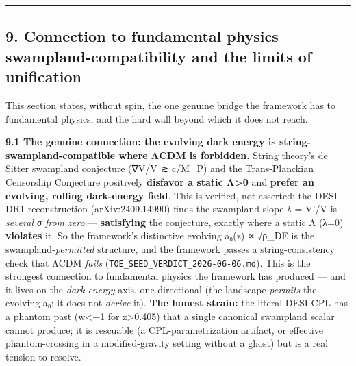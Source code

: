 \documentclass[
]{article}
\begin{document}
\begin{center}\rule{0.5\linewidth}{0.5pt}\end{center}

\subsection{9. Connection to fundamental physics ---
swampland-compatibility and the limits of
unification}\label{connection-to-fundamental-physics-swampland-compatibility-and-the-limits-of-unification}

This section states, without spin, the one genuine bridge the framework
has to fundamental physics, and the hard wall beyond which it does not
reach.

\textbf{9.1 The genuine connection: the evolving dark energy is
string-swampland-compatible where ΛCDM is forbidden.} String theory's de
Sitter swampland conjecture (\textbar∇V\textbar/V ≳ c/M\_P) and the
Trans-Planckian Censorship Conjecture positively \textbf{disfavor a
static Λ\textgreater0} and \textbf{prefer an evolving, rolling
dark-energy field}. This is verified, not asserted: the DESI DR1
reconstruction (arXiv:2409.14990) finds the swampland slope λ =
\textbar V'\textbar/V is \emph{several σ from zero} ---
\textbf{satisfying} the conjecture, exactly where a static Λ (λ=0)
\textbf{violates} it. So the framework's distinctive evolving a₀(z) ∝
√ρ\_DE is the swampland-\emph{permitted} structure, and the framework
passes a string-consistency check that ΛCDM \emph{fails}
(\texttt{TOE\_SEED\_VERDICT\_2026-06-06.md}). This is the strongest
connection to fundamental physics the framework has produced --- and it
lives on the \emph{dark-energy} axis, one-directional (the landscape
\emph{permits} the evolving a₀; it does not \emph{derive} it).
\textbf{The honest strain:} the literal DESI-CPL has a phantom past
(w\textless−1 for z\textgreater0.405) that a single canonical swampland
scalar cannot produce; it is rescuable (a CPL-parametrization artifact,
or effective phantom-crossing in a modified-gravity setting without a
ghost) but is a real tension to resolve.
\end{document}
